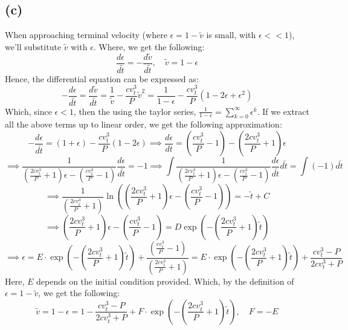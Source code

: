 \documentclass{article}
\begin{document}
\subsection*{(c)}
When approaching terminal velocity (where $\epsilon = 1-\tilde{v}$ is small, with $\epsilon<<1$), we'll substitute $\tilde{v}$ with $\epsilon$. Where, we get the following:
$$\frac{d\epsilon}{d\tilde{t}}=-\frac{d\tilde{v}}{d\tilde{t}},\quad \tilde{v}=1-\epsilon$$
Hence, the differential equation can be expressed as:
$$-\frac{d\epsilon}{d\tilde{t}}=\frac{d\tilde{v}}{d\tilde{t}}= \frac{1}{\tilde{v}}-\frac{cv_t^3}{P}\tilde{v}^2 = \frac{1}{1-\epsilon}-\frac{cv_t^3}{P}(1-2\epsilon+\epsilon^2)$$
Which, since $\epsilon<1$, then the using the taylor series, $\frac{1}{1-\epsilon} =\sum_{k=0}^{\infty}\epsilon^k$. If we extract all the above terms up to linear order, we get the following approximation:
$$-\frac{d\epsilon}{d\tilde{t}}=(1+\epsilon)-\frac{cv_t^3}{P}(1-2\epsilon)\implies \frac{d\epsilon}{dt}=\left(\frac{cv_t^3}{P}-1\right)-\left(\frac{2cv_t^3}{P}+1\right)\epsilon$$
$$\implies \frac{1}{\left(\frac{2cv_t^3}{P}+1\right)\epsilon-\left(\frac{cv_t^3}{P}-1\right)}\frac{d\epsilon}{d\tilde{t}} = -1 \implies \int \frac{1}{\left(\frac{2cv_t^3}{P}+1\right)\epsilon-\left(\frac{cv_t^3}{P}-1\right)}\frac{d\epsilon}{d\tilde{t}}d\tilde{t}=\int(-1)d\tilde{t}$$
$$\implies \frac{1}{\left(\frac{2cv_t^3}{P}+1\right)}\ln\left(\left(\frac{2cv_t^3}{P}+1\right)\epsilon-\left(\frac{cv_t^3}{P}-1\right)\right) = -\tilde{t}+C$$
$$\implies \left(\frac{2cv_t^3}{P}+1\right)\epsilon-\left(\frac{cv_t^3}{P}-1\right) = D\exp\left(-\left(\frac{2cv_t^3}{P}+1\right)\tilde{t}\right)$$
$$\implies \epsilon = E\cdot\exp\left(-\left(\frac{2cv_t^3}{P}+1\right)\tilde{t}\right) + \frac{\left(\frac{cv_t^3}{P}-1\right)}{\left(\frac{2cv_t^3}{P}+1\right)} = E\cdot\exp\left(-\left(\frac{2cv_t^3}{P}+1\right)\tilde{t}\right) + \frac{cv_t^3-P}{2cv_t^3+P}$$
Here, $E$ depends on the initial condition provided. Which, by the definition of $\epsilon=1-\tilde{v}$, we get the following:
$$\tilde{v}=1-\epsilon = 1-\frac{cv_t^3-P}{2cv_t^3+P}+F\cdot \exp\left(-\left(\frac{2cv_t^3}{P}+1\right)\tilde{t}\right),\quad F=-E$$
\end{document}
